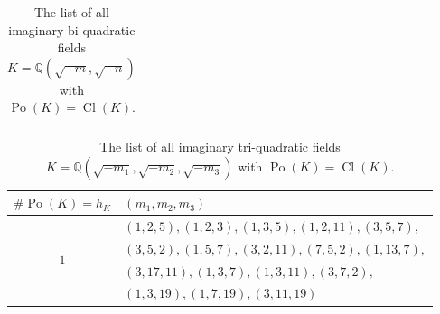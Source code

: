 \documentclass[12pt]{amsart}
\theoremstyle{definition}
\numberwithin{equation}{section}
\DeclareMathOperator{\Po}{Po}
\DeclareMathOperator{\Cl}{Cl}
\begin{document}
{\begin{table}[!h]
\begin{center}
\begin{tabular}{|c | c|p{6.5cm}|}
			\hline
		\end{tabular} \caption{The list of all imaginary bi-quadratic fields $K=\mathbb{Q}(\sqrt{-m},\sqrt{-n})$ with $\Po(K)=\Cl(K)$.} \label{tab, bi-quadratic Po=h}
	\end{center}
\end{table}


\begin{table}[!h]
	\begin{center}
		\begin{tabular}{|c|p{7.5cm}|} 
			\hline
			$\#\Po(K)=h_K$ & $( m_1,  m_2, m_3)$   \\ [0.5ex] 
			\hline \hline
			\multirow{4}{0.6em}{$1$} & $(1,2,5),(1,2,3),(1,3,5),(1,2,11),(3,5,7),$ \\
			& $(3,5,2),(1,5,7),(3,2,11),(7,5,2), (1,13,7),$ \\
			& $(3,17,11),(1,3,7),(1,3,11),(3,7,2),$ \\
			& $(1,3,19),(1,7,19),(3,11,19)$
			\\ \hline
		\end{tabular} 
		\caption{
			The list of all imaginary tri-quadratic fields\\
		\hspace*{1.9cm} $K=\mathbb{Q}(\sqrt{- m_1},\sqrt{- m_2}, \sqrt{- m_3})$ with $\Po(K)=\Cl(K)$.} 
	\label{tab, tri-quadratic Miyada}
\end{center}
\end{table}


}
\end{document}
